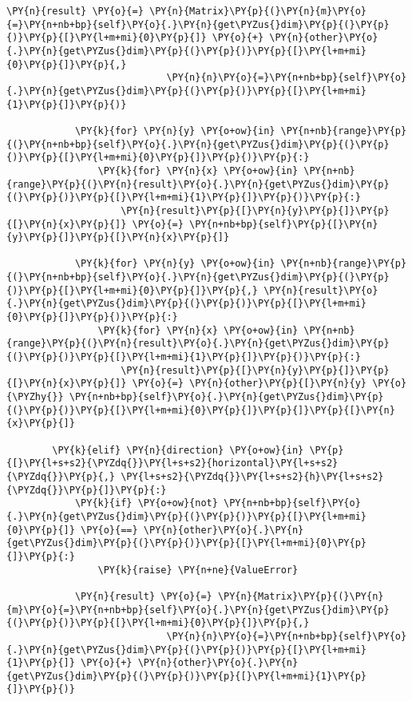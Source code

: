 \begin{Verbatim}[commandchars=\\\{\}]
            \PY{n}{result} \PY{o}{=} \PY{n}{Matrix}\PY{p}{(}\PY{n}{m}\PY{o}{=}\PY{n+nb+bp}{self}\PY{o}{.}\PY{n}{get\PYZus{}dim}\PY{p}{(}\PY{p}{)}\PY{p}{[}\PY{l+m+mi}{0}\PY{p}{]} \PY{o}{+} \PY{n}{other}\PY{o}{.}\PY{n}{get\PYZus{}dim}\PY{p}{(}\PY{p}{)}\PY{p}{[}\PY{l+m+mi}{0}\PY{p}{]}\PY{p}{,}
                            \PY{n}{n}\PY{o}{=}\PY{n+nb+bp}{self}\PY{o}{.}\PY{n}{get\PYZus{}dim}\PY{p}{(}\PY{p}{)}\PY{p}{[}\PY{l+m+mi}{1}\PY{p}{]}\PY{p}{)}

            \PY{k}{for} \PY{n}{y} \PY{o+ow}{in} \PY{n+nb}{range}\PY{p}{(}\PY{n+nb+bp}{self}\PY{o}{.}\PY{n}{get\PYZus{}dim}\PY{p}{(}\PY{p}{)}\PY{p}{[}\PY{l+m+mi}{0}\PY{p}{]}\PY{p}{)}\PY{p}{:}
                \PY{k}{for} \PY{n}{x} \PY{o+ow}{in} \PY{n+nb}{range}\PY{p}{(}\PY{n}{result}\PY{o}{.}\PY{n}{get\PYZus{}dim}\PY{p}{(}\PY{p}{)}\PY{p}{[}\PY{l+m+mi}{1}\PY{p}{]}\PY{p}{)}\PY{p}{:}
                    \PY{n}{result}\PY{p}{[}\PY{n}{y}\PY{p}{]}\PY{p}{[}\PY{n}{x}\PY{p}{]} \PY{o}{=} \PY{n+nb+bp}{self}\PY{p}{[}\PY{n}{y}\PY{p}{]}\PY{p}{[}\PY{n}{x}\PY{p}{]}

            \PY{k}{for} \PY{n}{y} \PY{o+ow}{in} \PY{n+nb}{range}\PY{p}{(}\PY{n+nb+bp}{self}\PY{o}{.}\PY{n}{get\PYZus{}dim}\PY{p}{(}\PY{p}{)}\PY{p}{[}\PY{l+m+mi}{0}\PY{p}{]}\PY{p}{,} \PY{n}{result}\PY{o}{.}\PY{n}{get\PYZus{}dim}\PY{p}{(}\PY{p}{)}\PY{p}{[}\PY{l+m+mi}{0}\PY{p}{]}\PY{p}{)}\PY{p}{:}
                \PY{k}{for} \PY{n}{x} \PY{o+ow}{in} \PY{n+nb}{range}\PY{p}{(}\PY{n}{result}\PY{o}{.}\PY{n}{get\PYZus{}dim}\PY{p}{(}\PY{p}{)}\PY{p}{[}\PY{l+m+mi}{1}\PY{p}{]}\PY{p}{)}\PY{p}{:}
                    \PY{n}{result}\PY{p}{[}\PY{n}{y}\PY{p}{]}\PY{p}{[}\PY{n}{x}\PY{p}{]} \PY{o}{=} \PY{n}{other}\PY{p}{[}\PY{n}{y} \PY{o}{\PYZhy{}} \PY{n+nb+bp}{self}\PY{o}{.}\PY{n}{get\PYZus{}dim}\PY{p}{(}\PY{p}{)}\PY{p}{[}\PY{l+m+mi}{0}\PY{p}{]}\PY{p}{]}\PY{p}{[}\PY{n}{x}\PY{p}{]}

        \PY{k}{elif} \PY{n}{direction} \PY{o+ow}{in} \PY{p}{[}\PY{l+s+s2}{\PYZdq{}}\PY{l+s+s2}{horizontal}\PY{l+s+s2}{\PYZdq{}}\PY{p}{,} \PY{l+s+s2}{\PYZdq{}}\PY{l+s+s2}{h}\PY{l+s+s2}{\PYZdq{}}\PY{p}{]}\PY{p}{:}
            \PY{k}{if} \PY{o+ow}{not} \PY{n+nb+bp}{self}\PY{o}{.}\PY{n}{get\PYZus{}dim}\PY{p}{(}\PY{p}{)}\PY{p}{[}\PY{l+m+mi}{0}\PY{p}{]} \PY{o}{==} \PY{n}{other}\PY{o}{.}\PY{n}{get\PYZus{}dim}\PY{p}{(}\PY{p}{)}\PY{p}{[}\PY{l+m+mi}{0}\PY{p}{]}\PY{p}{:}
                \PY{k}{raise} \PY{n+ne}{ValueError}

            \PY{n}{result} \PY{o}{=} \PY{n}{Matrix}\PY{p}{(}\PY{n}{m}\PY{o}{=}\PY{n+nb+bp}{self}\PY{o}{.}\PY{n}{get\PYZus{}dim}\PY{p}{(}\PY{p}{)}\PY{p}{[}\PY{l+m+mi}{0}\PY{p}{]}\PY{p}{,}
                            \PY{n}{n}\PY{o}{=}\PY{n+nb+bp}{self}\PY{o}{.}\PY{n}{get\PYZus{}dim}\PY{p}{(}\PY{p}{)}\PY{p}{[}\PY{l+m+mi}{1}\PY{p}{]} \PY{o}{+} \PY{n}{other}\PY{o}{.}\PY{n}{get\PYZus{}dim}\PY{p}{(}\PY{p}{)}\PY{p}{[}\PY{l+m+mi}{1}\PY{p}{]}\PY{p}{)}


\end{Verbatim}
